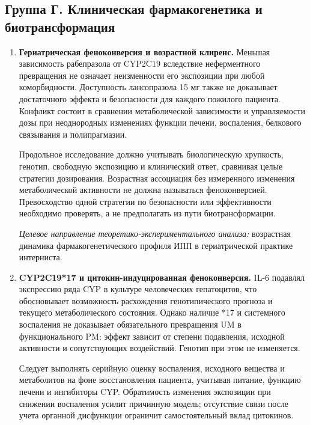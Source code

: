\documentclass[11pt,a4paper,notitlepage]{report}
\newcommand{\src}[1]{\unskip\space\cite{#1}}
\begin{document}
\subsection{Группа Г. Клиническая фармакогенетика и биотрансформация}
\begin{enumerate}[label=\textbf{\arabic*.},start=21,leftmargin=*,itemsep=0.9\baselineskip]

\item \textbf{Гериатрическая феноконверсия и возрастной клиренс.} Меньшая зависимость рабепразола от CYP2C19 вследствие неферментного превращения не означает неизменности его экспозиции при любой коморбидности. Доступность лансопразола 15 мг также не доказывает достаточного эффекта и безопасности для каждого пожилого пациента. Конфликт состоит в сравнении метаболической зависимости и управляемости дозы при неоднородных изменениях функции печени, воспаления, белкового связывания и полипрагмазии.\src{cpic,uslabel,leonova2015}

Продольное исследование должно учитывать биологическую хрупкость, генотип, свободную экспозицию и клинический ответ, сравнивая целые стратегии дозирования. Возрастная ассоциация без измеренного изменения метаболической активности не должна называться феноконверсией. Превосходство одной стратегии по безопасности или эффективности необходимо проверять, а не предполагать из пути биотрансформации.

\textit{Целевое направление теоретико-экспериментального анализа:} возрастная динамика фармакогенетического профиля ИПП в гериатрической практике интерниста.

\item \textbf{CYP2C19*17 и цитокин-индуцированная феноконверсия.} IL-6 подавлял экспрессию ряда CYP в культуре человеческих гепатоцитов, что обосновывает возможность расхождения генотипического прогноза и текущего метаболического состояния. Однако наличие *17 и системного воспаления не доказывает обязательного превращения UM в функционального PM: эффект зависит от степени подавления, исходной активности и сопутствующих воздействий. Генотип при этом не изменяется.\src{futureil62011,cpic}

Следует выполнять серийную оценку воспаления, исходного вещества и метаболитов на фоне восстановления пациента, учитывая питание, функцию печени и ингибиторы CYP. Обратимость изменения экспозиции при снижении воспаления усилит причинную модель; отсутствие связи после учета органной дисфункции ограничит самостоятельный вклад цитокинов.


\end{enumerate}
\end{document}
